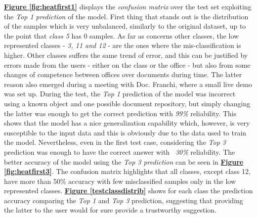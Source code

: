 \documentclass[12pt]{article}
\begin{document}
\hyperref[fig:heatfirst1]{\textbf{Figure \ref{fig:heatfirst1}}} displays the \textit{confusion matrix} over the test set exploiting the \textit{Top 1 prediction} of the model. First thing that stands out is the distribution of the samples which is very unbalanced, similarly to the original dataset, up to the point that \textit{class 5} has 0 samples. As far as concerns other classes, the low represented classes - \textit{3, 11 and 12} - are the ones where the mis-classification is higher. Other classes suffers the same trend of error, and this can be justified by errors made from the users - either on the class or the office - but also from some changes of competence between offices over documents during time. The latter reason also emerged during a meeting with Doc. Franchi, where a small live demo was set up. During the test, the \textit{Top 1} prediction of the model was incorrect using a known object and one possible document repository, but simply changing the latter was enough to get the correct prediction with \textit{99\%} reliability. This shows that the model has a nice generalization capability which, however, is very susceptible to the input data and this is obviously due to the data used to train the model. Nevertheless, even in the first test case, considering the \textit{Top 3} prediction was enough to have the correct answer with \textit{~30\%} reliability. The better accuracy of the model using the \textit{Top 3 prediction} can be seen in \hyperref[fig:heatfirst3]{\textbf{Figure \ref{fig:heatfirst3}}}. The confusion matrix highlights that all classes, except class 12, have more than 50\% accuracy with few misclassified samples only in the low represented classes. \hyperref[testclassdistrib]{\textbf{Figure \ref{testclassdistrib}}} shows for each class the prediction accuracy comparing the \textit{Top 1} and \textit{Top 3} prediction, suggesting that providing the latter to the user would for sure provide a trustworthy suggestion.
\end{document}

